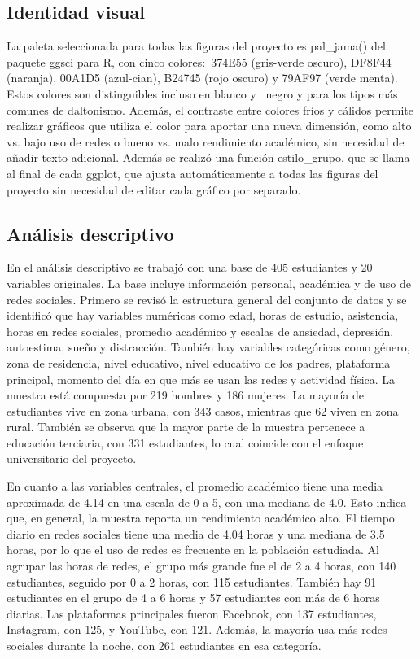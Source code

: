 \documentclass[12pt]{article}
\begin{document}
\subsection{Identidad visual}

La paleta seleccionada para todas las figuras del proyecto es pal\_jama() del paquete ggsci para R, con cinco colores: 374E55 (gris-verde oscuro), DF8F44 (naranja), 00A1D5 (azul-cian), B24745 (rojo oscuro) y 79AF97 (verde menta). Estos colores son distinguibles incluso en blanco y  negro y para los tipos más comunes de daltonismo. Además, el contraste entre colores fríos y cálidos permite realizar gráficos que utiliza el color para aportar una nueva dimensión, como alto vs. bajo uso de redes o bueno vs. malo rendimiento académico, sin necesidad de añadir texto adicional. Además se realizó una función estilo\_grupo, que se llama al final de cada ggplot, que ajusta automáticamente a todas las figuras del proyecto sin necesidad de editar cada gráfico por separado.

\subsection{Análisis descriptivo}

En el análisis descriptivo se trabajó con una base de 405 estudiantes y 20 variables originales. La base incluye información personal, académica y de uso de redes sociales. Primero se revisó la estructura general del conjunto de datos y se identificó que hay variables numéricas como edad, horas de estudio, asistencia, horas en redes sociales, promedio académico y escalas de ansiedad, depresión, autoestima, sueño y distracción. También hay variables categóricas como género, zona de residencia, nivel educativo, nivel educativo de los padres, plataforma principal, momento del día en que más se usan las redes y actividad física. La muestra está compuesta por 219 hombres y 186 mujeres. La mayoría de estudiantes vive en zona urbana, con 343 casos, mientras que 62 viven en zona rural. También se observa que la mayor parte de la muestra pertenece a educación terciaria, con 331 estudiantes, lo cual coincide con el enfoque universitario del proyecto.

En cuanto a las variables centrales, el promedio académico tiene una media aproximada de 4.14 en una escala de 0 a 5, con una mediana de 4.0. Esto indica que, en general, la muestra reporta un rendimiento académico alto. El tiempo diario en redes sociales tiene una media de 4.04 horas y una mediana de 3.5 horas, por lo que el uso de redes es frecuente en la población estudiada. Al agrupar las horas de redes, el grupo más grande fue el de 2 a 4 horas, con 140 estudiantes, seguido por 0 a 2 horas, con 115 estudiantes. También hay 91 estudiantes en el grupo de 4 a 6 horas y 57 estudiantes con más de 6 horas diarias. Las plataformas principales fueron Facebook, con 137 estudiantes, Instagram, con 125, y YouTube, con 121. Además, la mayoría usa más redes sociales durante la noche, con 261 estudiantes en esa categoría.
\end{document}
